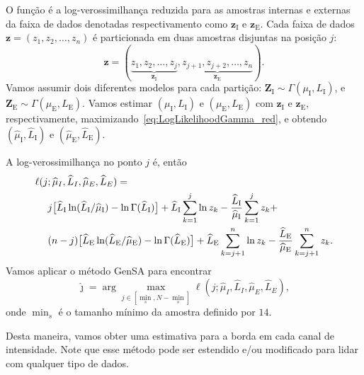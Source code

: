 O função é a log-verossimilhança reduzida para as amostras internas e externas da faixa de dados denotadas respectivamento como $\bm z_\text{I}$ e $\bm z_\text{E}$. Cada faixa de dados $\bm z = (z_1,z_2,\dots,z_n)$ é particionada em duas amostras disjuntas na posição $j$:  
$$
\bm z = (\underbrace{z_1,z_2,\dots,z_j}_{\bm z_\text{I}}, 
\underbrace{z_{j+1}, z_{j+2},\dots,z_n}_{\bm z_\text{E}}).
$$
Vamos assumir dois diferentes modelos para cada partição:
$\bm Z_\text{I} \sim \Gamma(\mu_\text{I},L_\text{I})$, e
$\bm Z_\text{E} \sim \Gamma(\mu_\text{E},L_\text{E})$.
Vamos estimar $(\mu_\text{I},L_\text{I})$ e $(\mu_\text{E},L_\text{E})$ com $\bm z_\text{I}$ e $\bm z_\text{E}$, respectivamente, maximizando~\eqref{eq:LogLikelihoodGamma_red}, e obtendo $(\widehat{\mu}_\text{I}, \widehat{L}_\text{I})$ e $(\widehat{\mu}_\text{E}, \widehat{L}_\text{E})$.


A log-verossimilhança no ponto $j$ é, então
\begin{equation}\label{eq:TotalLogLikelihood}
\begin{split}
\ell(j&;\widehat{\mu}_I, \widehat{L}_I,\widehat{\mu}_E, \widehat{L}_E)=\\
&j \big[\widehat{L}_\text{I}\ln (\widehat{L}_\text{I} / \widehat{\mu}_\text{I}) - \ln \Gamma(\widehat{L}_\text{I})\big]
+\widehat{L}_\text{I} \sum_{k=1}^{j}\ln z_k -\frac{\widehat{L}_\text{I}}{\widehat{\mu}_\text{I}}\sum_{k=1}^{j} z_k +\\
&(n-j) \big[\widehat{L}_\text{E}\ln (\widehat{L}_\text{E} / \widehat{\mu}_\text{E}) - \ln \Gamma(\widehat{L}_\text{E})\big]
+\widehat{L}_\text{E} \sum_{k=j+1}^{n}\ln z_k - \frac{\widehat{L}_\text{E}}{\widehat{\mu}_\text{E}}\sum_{k=j+1}^{n} z_k.
\raisetag{2.2em}
\end{split}
\end{equation}
Vamos aplicar o método GenSA para encontrar
$$
\widehat{\jmath}= \arg\max\limits_{j\in [\min_s,N-\min_s]}\ell(j;\widehat{\mu}_I, \widehat{L}_I,\widehat{\mu}_E, \widehat{L}_E),
$$ 
onde $\min_s$ é o tamanho mínimo da amostra definido por $14$.

Desta maneira, vamos obter uma estimativa para a borda em cada canal de intensidade.
Note que esse método pode ser estendido e/ou modificado para lidar com qualquer tipo de dados.

